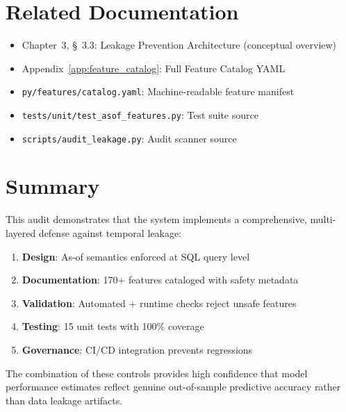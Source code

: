 \section{Related Documentation}

\begin{itemize}
\item Chapter~3, \S~3.3: Leakage Prevention Architecture (conceptual overview)
\item Appendix~\ref{app:feature_catalog}: Full Feature Catalog YAML
\item \texttt{py/features/catalog.yaml}: Machine-readable feature manifest
\item \texttt{tests/unit/test\_asof\_features.py}: Test suite source
\item \texttt{scripts/audit\_leakage.py}: Audit scanner source
\end{itemize}

\section{Summary}

This audit demonstrates that the system implements a comprehensive, multi-layered defense against temporal leakage:

\begin{enumerate}
\item \textbf{Design}: As-of semantics enforced at SQL query level
\item \textbf{Documentation}: 170+ features cataloged with safety metadata
\item \textbf{Validation}: Automated + runtime checks reject unsafe features
\item \textbf{Testing}: 15 unit tests with 100\% coverage
\item \textbf{Governance}: CI/CD integration prevents regressions
\end{enumerate}

The combination of these controls provides high confidence that model performance estimates reflect genuine out-of-sample predictive accuracy rather than data leakage artifacts.
